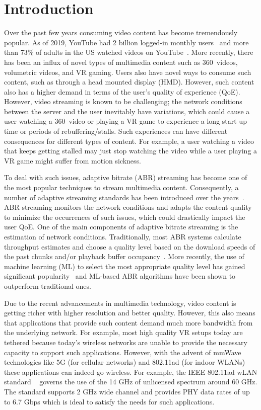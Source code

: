 \documentclass[sigconf,anonymous]{acmart}
\begin{document}
\graphicspath{{figs/}}

\section{Introduction} %

Over the past few years consuming video content has become tremendously popular. As of 2019, YouTube had 2 billion logged-in monthly users~\cite{statista} and more than 73\% of adults in the US watched videos on YouTube~\cite{pew-research}. More recently, there has been an influx of novel types of multimedia content such as 360\degree~videos, volumetric videos, and VR gaming. Users also have novel ways to consume such content, such as through a head mounted display (HMD). However, such content also has a higher demand in terms of the user's quality of experience (QoE). However, video streaming is known to be challenging; the network conditions between the server and the user inevitably have variations, which could cause a user watching a 360\degree~video or playing a VR game to experience a long start up time or periods of rebuffering/stalls. Such experiences can have different consequences for different types of content. For example, a user watching a video that keeps getting stalled may just stop watching the video while a user playing a VR game might suffer from motion sickness.

To deal with such issues, adaptive bitrate (ABR) streaming has become one of the most popular techniques to stream multimedia content. Consequently, a number of adaptive streaming standards has been introduced over the years~\cite{stockhammer:mmsys2011, pantos-hls, adobe-hds, microsoft-ss}. ABR streaming monitors the network conditions and adapts the content quality to minimize the occurrences of such issues, which could drastically impact the user QoE. One of the main components of adaptive bitrate streaming is the estimation of network conditions. Traditionally, most ABR systems calculate throughput estimates and choose a quality level based on the download speeds of the past chunks and/or playback buffer occupancy~\cite{sun:sigcomm2016, spiteri:infocom2016}. More recently, the use of machine learning (ML) to select the most appropriate quality level has gained significant popularity~\cite{mao:sigcomm2017, yan:nsdi2020} and ML-based ABR algorithms have been shown to outperform traditional ones.

Due to the recent advancements in multimedia technology, video content is getting richer with higher resolution and better quality. However, this also means that applications that provide such content demand much more bandwidth from the underlying network. For example, most high quality VR setups today are tethered because today's wireless networks are unable to provide the necessary capacity to support such applications. However, with the advent of mmWave technologies like 5G (for cellular networks) and 802.11ad (for indoor WLANs) these applications can indeed go wireless. For example, the IEEE 802.11ad wLAN standard ~\cite{80211ad} governs the use of the 14 GHz of unlicensed spectrum around 60 GHz. The standard supports 2 GHz wide channel and provides PHY data rates of up to 6.7 Gbps which is ideal to satisfy the needs for such applications.
\end{document}
